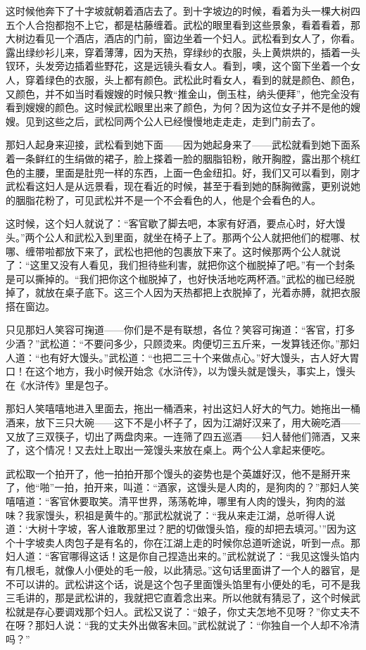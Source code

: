 \par 这时候他奔下了十字坡就朝着酒店去了。到十字坡边的时候，看着为头一棵大树四五个人合抱都抱不上它，都是枯藤缠着。武松的眼里看到这些景象，看着看着，那大树边看见一个酒店，酒店的门前，窗边坐着一个妇人。武松看到女人了，你看。露出绿纱衫儿来，穿着薄薄，因为天热，穿绿纱的衣服，头上黄烘烘的，插着一头钗环，头发旁边插着些野花，这是远镜头看女人。看到，噢，这个窗下坐着一个女人，穿着绿色的衣服，头上都有颜色。武松此时看女人，看到的就是颜色、颜色，又颜色，并不如当时看嫂嫂的时候只教“推金山，倒玉柱，纳头便拜”，他完全没有看到嫂嫂的颜色。这时候武松眼里出来了颜色，为何？因为这位女子并不是他的嫂嫂。见到这些之后，武松同两个公人已经慢慢地走走走，走到门前去了。
\par 那妇人起身来迎接，武松看到她下面——因为她起身来了——武松就看到她下面系着一条鲜红的生绢做的裙子，脸上搽着一脸的胭脂铅粉，敞开胸膛，露出那个桃红色的主腰，里面是肚兜一样的东西，上面一色金纽扣。好，我们又可以看到，刚才武松看这妇人是从远景看，现在看近的时候，甚至于看到她的酥胸微露，更别说她的胭脂花粉了，可见武松并不是一个不会看色的人，他是个会看色的人。
\par 这时候，这个妇人就说了：“客官歇了脚去吧，本家有好酒，要点心时，好大馒头。”两个公人和武松入到里面，就坐在椅子上了。那两个公人就把他们的棍哪、杖哪、缠带啦都放下来了，武松也把他的包裹放下来了。这时候那两个公人就说了：“这里又没有人看见，我们担待些利害，就把你这个枷脱掉了吧。”有一个封条是可以撕掉的。“我们把你这个枷脱掉了，也好快活地吃两杯酒。”武松的枷已经脱掉了，就放在桌子底下。这三个人因为天热都把上衣脱掉了，光着赤膊，就把衣服搭在窗边。
\par 只见那妇人笑容可掬道——你们是不是有联想，各位？笑容可掬道：“客官，打多少酒？”武松道：“不要问多少，只顾烫来。肉便切三五斤来，一发算钱还你。”那妇人道：“也有好大馒头。”武松道：“也把二三十个来做点心。”好大馒头，古人好大胃口！在这个地方，我小时候开始念《水浒传》，以为馒头就是馒头，事实上，馒头在《水浒传》里是包子。
\par 那妇人笑嘻嘻地进入里面去，拖出一桶酒来，衬出这妇人好大的气力。她拖出一桶酒来，放下三只大碗——这下不是小杯子了，因为江湖好汉来了，用大碗吃酒——又放了三双筷子，切出了两盘肉来。一连筛了四五巡酒——妇人替他们筛酒，又来了，这个情况！又去灶上取出一笼馒头来放在桌上。两个公人拿起来便吃。
\par 武松取一个拍开了，他一拍拍开那个馒头的姿势也是个英雄好汉，他不是掰开来了，他“啪”一拍，拍开来，叫道：“酒家，这馒头是人肉的，是狗肉的？”那妇人笑嘻嘻道：“客官休要取笑。清平世界，荡荡乾坤，哪里有人肉的馒头，狗肉的滋味？我家馒头，积祖是黄牛的。”那武松就说了：“我从来走江湖，总听得人说道：‘大树十字坡，客人谁敢那里过？肥的切做馒头馅，瘦的却把去填河。’”因为这个十字坡卖人肉包子是有名的，你在江湖上走的时候你总道听途说，听到一点。那妇人道：“客官哪得这话！这是你自己捏造出来的。”武松就说了：“我见这馒头馅内有几根毛，就像人小便处的毛一般，以此猜忌。”这句话里面讲了一个人的器官，是不可以讲的。武松讲这个话，说是这个包子里面馒头馅里有小便处的毛，可不是我三毛讲的，那是武松讲的，我就把它直着念出来。所以他就有猜忌了，这个时候武松就是存心要调戏那个妇人。武松又说了：“娘子，你丈夫怎地不见呀？”你丈夫不在呀？那妇人说：“我的丈夫外出做客未回。”武松就说了：“你独自一个人却不冷清吗？”
